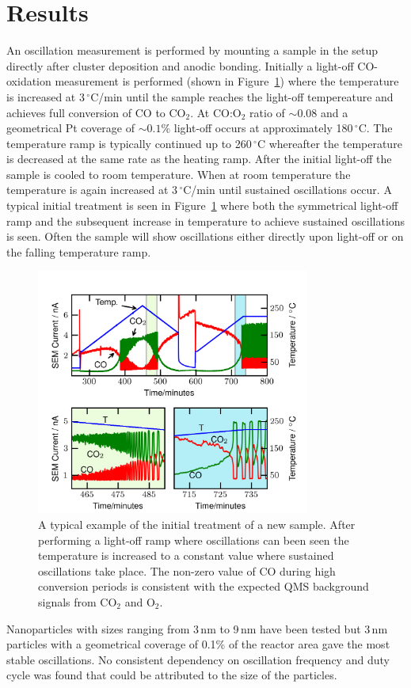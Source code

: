 \documentclass[8.5pt,twoside,twocolumn]{article}
\begin{document}
\section{Results}
An oscillation measurement is performed by mounting a sample in the setup directly after cluster deposition and anodic bonding. Initially a light-off CO-oxidation measurement is performed (shown in Figure~\ref{fgr:initial_treatment}) where the temperature is increased at 3\,$^\circ$C/min until the sample reaches the light-off tempereature and achieves full conversion of CO to CO$_2$. At CO:O$_2$ ratio of $\sim0.08$ and a geometrical Pt coverage of $\sim0.1\%$ light-off occurs at approximately 180\,$^\circ$C. The temperature ramp is typically continued up to 260\,$^\circ$C whereafter the temperature is decreased at the same rate as the heating ramp. After the initial light-off the sample is cooled to room temperature. When at room temperature the temperature is again increased at 3\,$^\circ$C/min until sustained oscillations occur. A typical initial treatment is seen in Figure~\ref{fgr:initial_treatment} where both the symmetrical light-off ramp and the subsequent increase in temperature to achieve sustained oscillations is seen. Often the sample will show oscillations either directly upon light-off or on the falling temperature ramp.
\begin{figure}[h]
\centering
  \includegraphics[width=9cm]{initial_treatment.png}
  \caption{A typical example of the initial treatment of a new sample. After performing a light-off ramp where oscillations can been seen the temperature is increased to a constant value where sustained oscillations take place. The non-zero value of CO during high conversion periods is consistent with the expected QMS background signals from CO$_2$ and O$_2$.}
  \label{fgr:initial_treatment}
\end{figure}
Nanoparticles with sizes ranging from 3\,nm to 9\,nm have been tested but 3\,nm particles with a geometrical coverage of 0.1\% of the reactor area gave the most stable oscillations. No consistent dependency on oscillation frequency and duty cycle was found that could be attributed to the size of the particles.
\end{document}
